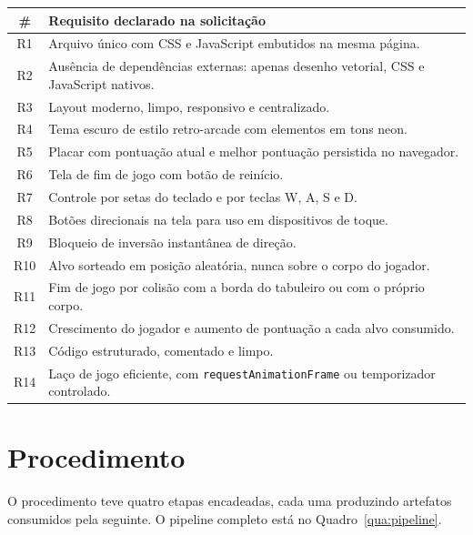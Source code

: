 \begin{quadro}[htb]
	\caption{Requisitos declarados na solicitação original do produto}
	\label{qua:requisitos-origem}
	\centering
	\footnotesize
	\begin{tabularx}{\textwidth}{@{}c X@{}}
		\toprule
		\textbf{\#} & \textbf{Requisito declarado na solicitação} \\
		\midrule
		R1 & Arquivo único com CSS e JavaScript embutidos na mesma página. \\
		R2 & Ausência de dependências externas: apenas desenho vetorial, CSS e JavaScript nativos. \\
		R3 & Layout moderno, limpo, responsivo e centralizado. \\
		R4 & Tema escuro de estilo retro-arcade com elementos em tons neon. \\
		R5 & Placar com pontuação atual e melhor pontuação persistida no navegador. \\
		R6 & Tela de fim de jogo com botão de reinício. \\
		R7 & Controle por setas do teclado e por teclas W, A, S e D. \\
		R8 & Botões direcionais na tela para uso em dispositivos de toque. \\
		R9 & Bloqueio de inversão instantânea de direção. \\
		R10 & Alvo sorteado em posição aleatória, nunca sobre o corpo do jogador. \\
		R11 & Fim de jogo por colisão com a borda do tabuleiro ou com o próprio corpo. \\
		R12 & Crescimento do jogador e aumento de pontuação a cada alvo consumido. \\
		R13 & Código estruturado, comentado e limpo. \\
		R14 & Laço de jogo eficiente, com \texttt{requestAnimationFrame} ou temporizador controlado. \\
		\bottomrule
	\end{tabularx}
\end{quadro}

\section{Procedimento}
\label{sec:procedimento}

O procedimento teve quatro etapas encadeadas, cada uma produzindo artefatos
consumidos pela seguinte. O pipeline completo está no Quadro~\ref{qua:pipeline}.

